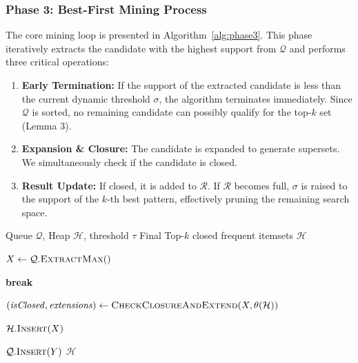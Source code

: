 \documentclass[10pt,letterpaper]{article}
\begin{document}
\subsubsection*{Phase 3: Best-First Mining Process}
The core mining loop is presented in Algorithm~\ref{alg:phase3}. This phase iteratively extracts the candidate with the highest support from $\mathcal{Q}$ and performs three critical operations:
\begin{enumerate}
    \item \textbf{Early Termination:} If the support of the extracted candidate is less than the current dynamic threshold $\sigma$, the algorithm terminates immediately. Since $\mathcal{Q}$ is sorted, no remaining candidate can possibly qualify for the top-$k$ set (Lemma 3).
    \item \textbf{Expansion \& Closure:} The candidate is expanded to generate supersets. We simultaneously check if the candidate is closed.
    \item \textbf{Result Update:} If closed, it is added to $\mathcal{R}$. If $\mathcal{R}$ becomes full, $\sigma$ is raised to the support of the $k$-th best pattern, effectively pruning the remaining search space.
\end{enumerate}

\begin{algorithm}[H]
\caption{Phase 3: Best-First Mining}
\label{alg:phase3}
\begin{algorithmic}[1]
\footnotesize
\REQUIRE Queue $\mathcal{Q}$, Heap $\mathcal{H}$, threshold $\tau$
\ENSURE Final Top-$k$ closed frequent itemsets $\mathcal{H}$

    \STATE $X \leftarrow \mathcal{Q}.\textsc{ExtractMax}()$
    
        \STATE \textbf{break}
    \ENDIF
    
    \STATE $(\mathit{isClosed}, \mathit{extensions}) \leftarrow \textsc{CheckClosureAndExtend}(X, \theta(\mathcal{H}))$
    
        \STATE $\mathcal{H}.\textsc{Insert}(X)$
    \ENDIF
    
            \STATE $\mathcal{Q}.\textsc{Insert}(Y)$
        \ENDIF
    \ENDFOR
\ENDWHILE
\RETURN $\mathcal{H}$
\end{algorithmic}
\end{algorithm}
\end{document}
